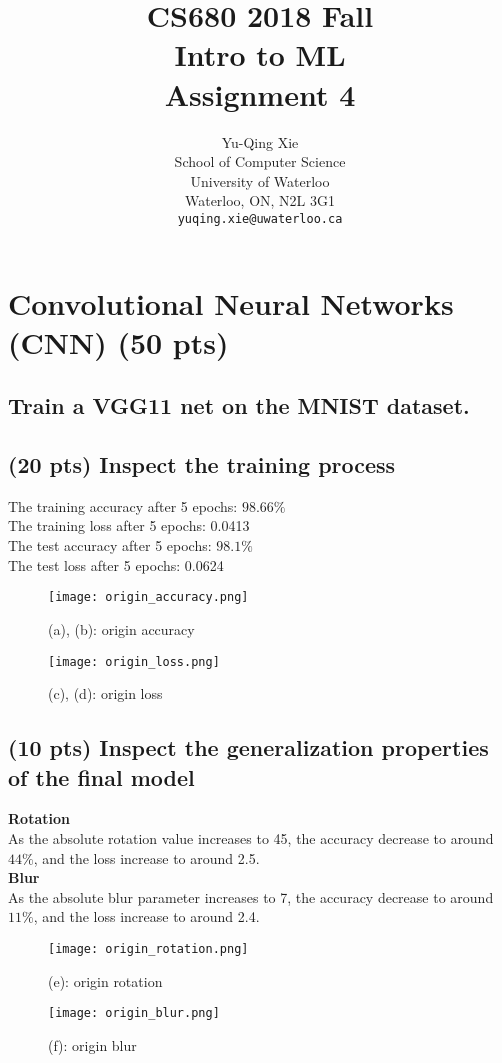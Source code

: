 \documentclass{article}
\title{CS680 2018 Fall\\Intro to ML\\Assignment 4}
\author{
	Yu-Qing Xie \\
	School of Computer Science\\
	University of Waterloo\\
	Waterloo, ON, N2L 3G1 \\
	\texttt{yuqing.xie@uwaterloo.ca} \\
}
\begin{document}
\maketitle
\section{Convolutional Neural Networks (CNN) (50 pts)}

\subsection{Train a VGG11 net on the MNIST dataset.}

\subsection{(20 pts) Inspect the training process}
The training accuracy after 5 epochs: $98.66\%$\\
The training loss after 5 epochs: 0.0413\\
The test accuracy after 5 epochs: $98.1\%$\\
The test loss after 5 epochs: 0.0624\\
\begin{figure}[h]
	\begin{minipage}[b]{.5\textwidth}\centering
		\texttt{[image: origin\_accuracy.png]}
		\caption{(a), (b): origin accuracy}\label{origin_accuracy}
	\end{minipage}
	\begin{minipage}[b]{.5\textwidth}\centering
		\texttt{[image: origin\_loss.png]}
		\caption{(c), (d): origin loss}\label{origin_loss}
	\end{minipage}
\end{figure}

\subsection{(10 pts) Inspect the generalization properties of the final model}
\textbf{Rotation}\\
As the absolute rotation value increases to 45, the accuracy decrease to around $44\%$, and the loss increase to around 2.5.\\
\textbf{Blur}\\
As the absolute blur parameter increases to 7, the accuracy decrease to around $11\%$, and the loss increase to around 2.4.\\
\begin{figure}[h]
	\begin{minipage}[b]{.5\textwidth}\centering
		\texttt{[image: origin\_rotation.png]}
		\caption{(e): origin rotation}\label{origin_rotation}
	\end{minipage}
	\begin{minipage}[b]{.5\textwidth}\centering
		\texttt{[image: origin\_blur.png]}
		\caption{(f): origin blur}\label{origin_blur}
	\end{minipage}
\end{figure}
\end{document}
